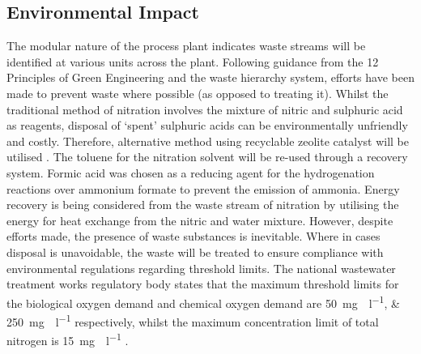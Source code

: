 

\subsection{Environmental Impact}

The modular nature of the process plant indicates waste streams will be identified at various units across the plant. Following guidance from the 12 Principles of Green Engineering and the waste hierarchy system, efforts have been made to prevent waste where possible (as opposed to treating it). Whilst the traditional method of nitration involves the mixture of nitric and sulphuric acid as reagents, disposal of ‘spent’ sulphuric acids can be environmentally unfriendly and costly. Therefore, alternative method using recyclable zeolite catalyst will be utilised \cite{smith_superior_1996}. The toluene for the nitration solvent will be re-used through a recovery system. Formic acid was chosen as a reducing agent for the hydrogenation reactions over ammonium formate to prevent the emission of  ammonia. Energy recovery is being considered from the waste stream of nitration by utilising the energy for heat exchange from the nitric and water mixture. However, despite efforts made, the presence of waste substances is inevitable. Where in cases disposal is unavoidable, the waste will be treated to ensure compliance with environmental regulations regarding threshold limits. The national wastewater treatment works regulatory body states that the maximum threshold limits for the biological oxygen demand and chemical oxygen demand are \SIlist{50;250}{\mg{}\per\l} respectively, whilst the maximum concentration limit of total nitrogen is \SI{15}{\mg{}\per\l} \cite{noauthor_waste_nodate}.
